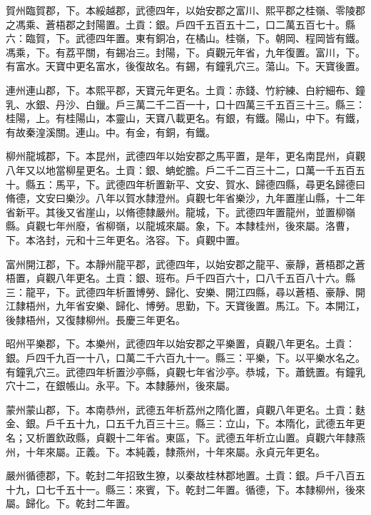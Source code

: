 \begin{pinyinscope}
 賀州臨賀郡，下。本綏越郡，武德四年，以始安郡之富川、熙平郡之桂嶺、零陵郡之馮乘、蒼梧郡之封陽置。土貢：銀。戶四千五百五十二，口二萬五百七十。縣六：臨賀，下。武德四年置。東有銅冶，在橘山。桂嶺，下。朝岡、程岡皆有鐵。馮乘，下。有荔平關，有錫冶三。封陽，下。貞觀元年省，九年復置。富川，下。有富水。天寶中更名富水，後復故名。有錫，有鐘乳穴三。蕩山。下。天寶後置。



 連州連山郡，下。本熙平郡，天寶元年更名。土貢：赤錢、竹紵練、白紵細布、鐘乳、水銀、丹沙、白鑞。戶三萬二千二百一十，口十四萬三千五百三十三。縣三：桂陽，上。有桂陽山，本靈山，天寶八載更名。有銀，有鐵。陽山，中下。有鐵，有故秦湟溪關。連山。中。有金，有銅，有鐵。



 柳州龍城郡，下。本昆州，武德四年以始安郡之馬平置，是年，更名南昆州，貞觀八年又以地當柳星更名。土貢：銀、蚺蛇膽。戶二千二百三十二，口萬一千五百五十。縣五：馬平，下。武德四年析置新平、文安、賀水、歸德四縣，尋更名歸德曰脩德，文安曰樂沙。八年以賀水隸澄州。貞觀七年省樂沙，九年置崖山縣，十二年省新平。其後又省崖山，以脩德隸嚴州。龍城，下。武德四年置龍州，並置柳嶺縣。貞觀七年州廢，省柳嶺，以龍城來屬。象，下。本隸桂州，後來屬。洛曹，下。本洛封，元和十三年更名。洛容。下。貞觀中置。



 富州開江郡，下。本靜州龍平郡，武德四年，以始安郡之龍平、豪靜，蒼梧郡之蒼梧置，貞觀八年更名。土貢：銀、班布。戶千四百六十，口八千五百八十六。縣三：龍平，下。武德四年析置博勞、歸化、安樂、開江四縣，尋以蒼梧、豪靜、開江隸梧州，九年省安樂、歸化、博勞。思勤，下。天寶後置。馬江。下。本開江，後隸梧州，又復隸柳州。長慶三年更名。



 昭州平樂郡，下。本樂州，武德四年以始安郡之平樂置，貞觀八年更名。土貢：銀。戶四千九百一十八，口萬二千六百九十一。縣三：平樂，下。以平樂水名之。有鐘乳穴三。武德四年析置沙亭縣，貞觀七年省沙亭。恭城，下。蕭銑置。有鐘乳穴十二，在銀帳山。永平。下。本隸藤州，後來屬。



 蒙州蒙山郡，下。本南恭州，武德五年析荔州之隋化置，貞觀八年更名。土貢：麩金、銀。戶千五十九，口五千九百三十三。縣三：立山，下。本隋化，武德五年更名；又析置欽政縣，貞觀十二年省。東區，下。武德五年析立山置。貞觀六年隸燕州，十年來屬。正義。下。本純義，隸燕州，十年來屬。永貞元年更名。



 嚴州循德郡，下。乾封二年招致生獠，以秦故桂林郡地置。土貢：銀。戶千八百五十九，口七千五十一。縣三：來賓，下。乾封二年置。循德，下。本隸柳州，後來屬。歸化。下。乾封二年置。




\end{pinyinscope}
